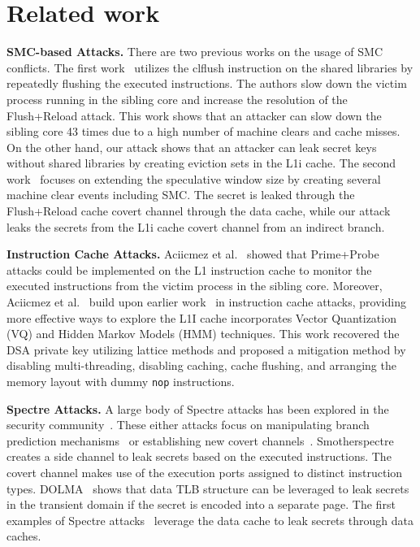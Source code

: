 \section{Related work}\label{sec:relatedwork}

\noindent\textbf{SMC-based Attacks.} There are two previous works on the usage of SMC conflicts. The first work~\cite{aldaya2022hyperdegrade} utilizes the clflush instruction on the shared libraries by repeatedly flushing the executed instructions. The authors slow down the victim process running in the sibling core and increase the resolution of the Flush+Reload attack. This work shows that an attacker can slow down the sibling core 43 times due to a high number of machine clears and cache misses. On the other hand, our attack shows that an attacker can leak secret keys without shared libraries by creating eviction sets in the L1i cache. The second work~\cite{ragab2021rage} focuses on extending the speculative window size by creating several machine clear events including SMC. The secret is leaked through the Flush+Reload cache covert channel through the data cache, while our attack leaks the secrets from the L1i cache covert channel from an indirect branch.

\noindent\textbf{Instruction Cache Attacks.}
Aciicmez et al.~\cite{aciiccmez2007yet} showed that Prime+Probe attacks could be implemented on the L1 instruction cache to monitor the executed instructions from the victim process in the sibling core. %
Moreover, Aciicmez et al.~\cite{aciiccmez2010new} build upon earlier work~\cite{aciiccmez2007yet} in instruction cache attacks, providing more effective ways to explore the L1I cache incorporates Vector Quantization (VQ) and Hidden Markov Models (HMM) techniques. This work recovered the DSA private key utilizing lattice methods and proposed a mitigation method by disabling multi-threading, disabling caching, cache flushing, and arranging the memory layout with dummy \texttt{nop} instructions.

\noindent\textbf{Spectre Attacks.} A large body of Spectre attacks has been explored in the security community~\cite{xiong2021survey,canella2019systematic}. These either attacks focus on manipulating branch prediction mechanisms~\cite{kocher2020spectre,chen2019sgxpectre,koruyeh2018spectre,van2020lvi} or establishing new covert channels~\cite{bhattacharyya2019smotherspectre,loughlin2021dolma,kocher2020spectre}. %
Smotherspectre~\cite{bhattacharyya2019smotherspectre} creates a side channel to leak secrets based on the executed instructions. The covert channel makes use of the execution ports assigned to distinct instruction types. DOLMA~\cite{loughlin2021dolma} shows that data TLB structure can be leveraged to leak secrets in the transient domain if the secret is encoded into a separate page. The first examples of Spectre attacks~\cite{kocher2020spectre} leverage the data cache to leak secrets through data caches.   